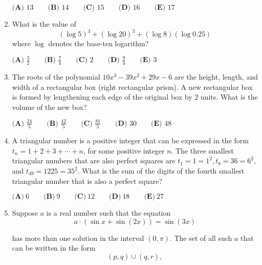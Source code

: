 \documentclass{article}
\begin{document}
\begin{enumerate}[label=\arabic*., itemsep=0.5em]
\(\textbf{(A) } 13 \qquad \textbf{(B) } 14 \qquad \textbf{(C) } 15 \qquad \textbf{(D) } 16 \qquad \textbf{(E) } 17\)\par \vspace{0.5em}\item What is the value of 
\begin{equation*}
(\log 5)^3+(\log 20)^3+(\log 8)(\log 0.25)
\end{equation*}
 where \(\log\) denotes the base-ten logarithm?

\(\textbf{(A) } \frac{3}{2} \qquad \textbf{(B) } \frac{7}{4} \qquad \textbf{(C) } 2 \qquad \textbf{(D) } \frac{9}{4} \qquad \textbf{(E) } 3\)\par \vspace{0.5em}\item The roots of the polynomial \(10x^3-39x^2+29x-6\) are the height, length, and width of a rectangular box (right rectangular prism). A new rectangular box is formed by lengthening each edge of the original box by \(2\) units. What is the volume of the new box?

\(\textbf{(A) } \frac{24}{5} \qquad \textbf{(B) } \frac{42}{5} \qquad \textbf{(C) } \frac{81}{5} \qquad \textbf{(D) } 30 \qquad \textbf{(E) } 48\)\par \vspace{0.5em}\item A triangular number is a positive integer that can be expressed in the form \(t_n=1+2+3+\cdots+n\), for some positive integer \(n\). The three smallest triangular numbers that are also perfect squares are \(t_1=1=1^2, t_8=36=6^2,\) and \(t_{49}=1225=35^2\). What is the sum of the digits of the fourth smallest triangular number that is also a perfect square?

\(\textbf{(A)} ~6 \qquad\textbf{(B)} ~9 \qquad\textbf{(C)} ~12 \qquad\textbf{(D)} ~18 \qquad\textbf{(E)} ~27 \)\par \vspace{0.5em}\item Suppose \(a\) is a real number such that the equation 
\begin{equation*}
a\cdot(\sin{x}+\sin{(2x)}) = \sin{(3x)}
\end{equation*}

has more than one solution in the interval \((0, \pi)\). The set of all such \(a\) that can be written
in the form 
\begin{equation*}
(p,q) \cup (q,r),
\end{equation*}


\end{enumerate}
\end{document}

